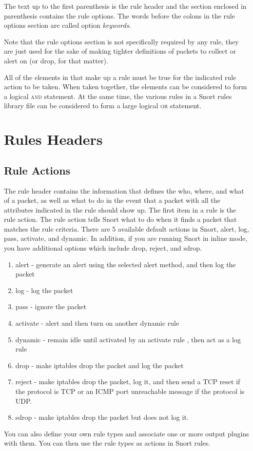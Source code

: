 \documentclass[english]{report}
\newenvironment{note}{
\samepage
    \vspace{10pt}{\textsf{
        {\hspace{7pt}\Huge{$\triangle$\hspace{-12.5pt}{\Large{$^!$}}}}\hspace{5pt}
        {\Large{NOTE}}
    }
    }
   \begin{center}
    \par\vspace{-17pt}

    \begin{lrbox}{\savepar}
    \begin{minipage}[r]{6in}
}
{
    \end{minipage}
    \end{lrbox}
    \fbox{
        \usebox{
            \savepar
	}
    }
    \par\vskip10pt
    \end{center}
}
\begin{document}
The text up to the first parenthesis is the rule header and the section
enclosed in parenthesis contains the rule options. The words before the
colons in the rule options section are called option \emph{keywords}. 

\begin{note}
Note that the rule options section is not specifically required by any
rule, they are just used for the sake of making tighter definitions
of packets to collect or alert on (or drop, for that matter). 
\end{note}

All of the elements in that make up a rule must be true for the indicated
rule action to be taken. When taken together, the elements can be
considered to form a logical \textsc{and} statement. At the same time,
the various rules in a Snort rules library file can be considered
to form a large logical \textsc{or} statement. 


\section{Rules Headers}


\subsection{Rule Actions \label{rules action section}}

The rule header contains the information that defines the who,
where, and what of a packet, as well as what to do in the
event that a packet with all the attributes indicated in the rule
should show up. The first item in a rule is the rule action. The rule
action tells Snort what to do when it finds a packet that matches
the rule criteria. There are 5 available default actions in Snort,
alert, log, pass, activate, and dynamic. In addition, if you are running
Snort in inline mode, you have additional options which include drop, reject, and sdrop. 

\begin{enumerate}
\item alert - generate an alert using the selected alert method, and then
log the packet 
\item log - log the packet 
\item pass - ignore the packet 
\item activate - alert and then turn on another dynamic rule  
\item dynamic - remain idle until activated by an activate rule , then act
as a log rule
\item drop - make iptables drop the packet and log the packet
\item reject - make iptables drop the packet, log it, and then send a 
TCP reset if the protocol is TCP or an ICMP port unreachable message if the 
protocol is UDP.
\item sdrop - make iptables drop the packet but does not log it.
\end{enumerate}
You can also define your own rule types and associate one or more
output plugins with them. You can then use the rule types as actions
in Snort rules.
\end{document}
